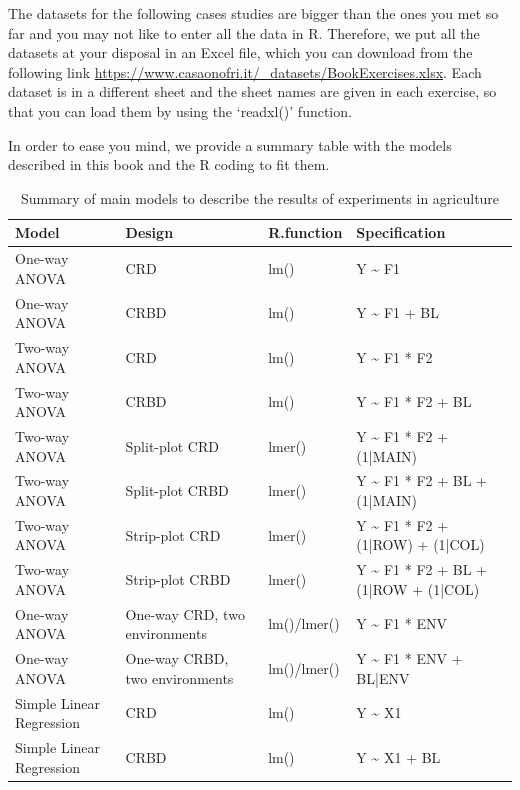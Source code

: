 \documentclass[a4paper,12pt,oneside]{book}
\begin{document}
The datasets for the following cases studies are bigger than the ones you met so far and you may not like to enter all the data in R. Therefore, we put all the datasets at your disposal in an Excel file, which you can download from the following link \url{https://www.casaonofri.it/_datasets/BookExercises.xlsx}. Each dataset is in a different sheet and the sheet names are given in each exercise, so that you can load them by using the `readxl()' function.

In order to ease you mind, we provide a summary table with the models described in this book and the R coding to fit them.

\begin{table}

\caption{\label{tab:unnamed-chunk-218}Summary of main models to describe the results of experiments in agriculture}
\centering
\begin{tabular}[t]{l|l|l|l}
\hline
Model & Design & R.function & Specification\\
\hline
One-way ANOVA & CRD & lm() & Y \textasciitilde{} F1\\
\hline
One-way ANOVA & CRBD & lm() & Y \textasciitilde{} F1 + BL\\
\hline
Two-way ANOVA & CRD & lm() & Y \textasciitilde{} F1 * F2\\
\hline
Two-way ANOVA & CRBD & lm() & Y \textasciitilde{} F1 * F2 + BL\\
\hline
Two-way ANOVA & Split-plot CRD & lmer() & Y \textasciitilde{} F1 * F2 + (1|MAIN)\\
\hline
Two-way ANOVA & Split-plot CRBD & lmer() & Y \textasciitilde{} F1 * F2 + BL + (1|MAIN)\\
\hline
Two-way ANOVA & Strip-plot CRD & lmer() & Y \textasciitilde{} F1 * F2 + (1|ROW) + (1|COL)\\
\hline
Two-way ANOVA & Strip-plot CRBD & lmer() & Y \textasciitilde{} F1 * F2 + BL + (1|ROW + (1|COL)\\
\hline
One-way ANOVA & One-way CRD, two environments & lm()/lmer() & Y \textasciitilde{} F1 * ENV\\
\hline
One-way ANOVA & One-way CRBD, two environments & lm()/lmer() & Y \textasciitilde{} F1 * ENV + BL|ENV\\
\hline
Simple Linear Regression & CRD & lm() & Y \textasciitilde{} X1\\
\hline
Simple Linear Regression & CRBD & lm() & Y \textasciitilde{} X1 + BL\\
\hline
\end{tabular}
\end{table}
\end{document}
